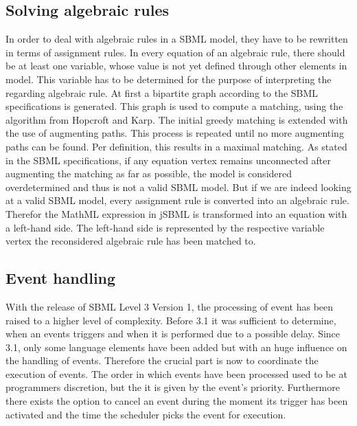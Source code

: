 \documentclass[10pt]{bmc_article}
\newenvironment{bmcformat}{\baselineskip20pt\sloppy\setboolean{publ}{false}}{\baselineskip20pt\sloppy}
\begin{document}
\begin{bmcformat}
\subsection{Solving algebraic rules}
In order to deal with algebraic rules in a SBML model, they have to be rewritten in terms
of assignment rules. In every equation of an algebraic rule, there should be at least one variable, 
whose value is not yet defined through other elements in model. This variable has to be determined 
for the purpose of interpreting the regarding algebraic rule.
At first a bipartite graph according to the SBML specifications is generated. This graph is used to 
compute a matching, using the algorithm from Hopcroft and Karp\cite{hopcroft1973n}. The initial 
greedy matching is extended with the use of augmenting paths. This process is
repeated until no more augmenting paths can be found. Per definition, this results in a maximal matching. 
As stated in the SBML specifications, if any equation vertex remains unconnected after augmenting the 
matching as far as possible, the model is considered overdetermined and thus is not a valid SBML model. 
But if we are indeed looking at a valid SBML model, every assignment rule is converted into an algebraic rule. 
Therefor the MathML expression in jSBML is transformed into an equation with a left-hand side. The left-hand 
side is represented by the respective variable vertex the reconsidered algebraic rule has been matched to.

\subsection{Event handling}
With the release of SBML Level 3 Version 1, the processing of event has been raised to a higher level of 
complexity. Before 3.1 it was sufficient to determine, when an events triggers and when it is performed 
due to a possible delay. Since 3.1, only some language elements have been added but with an huge 
influence on the handling of events. Therefore the crucial part is now to coordinate the execution of events. 
The order in which events have been processed used to be at programmers discretion, but the it is given 
by the event's priority. Furthermore there exists the option to cancel an event during the moment its trigger 
has been activated and the time the scheduler picks the event for execution. 


\end{bmcformat}
\end{document}
